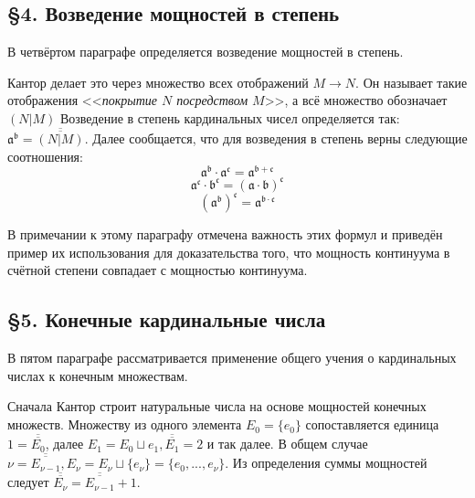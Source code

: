 \documentclass[a4paper,12pt]{extarticle}
\theoremstyle{definition}
\newcommand{\cit}[1]{<<\textit{#1}>>}
\newcommand{\car}[1]{\overline{\overline{#1}}}
\begin{document}
\subsection{\S 4. Возведение мощностей в степень}
В четвёртом параграфе определяется возведение мощностей в степень.

Кантор делает это через множество всех отображений $M \rightarrow N$.
Он называет такие отображения \cit{покрытие $N$ посредством $M$}, а всё множество обозначает $(N|M)$
Возведение в степень кардинальных чисел определяется так: $\mathfrak{a^b} = \car{(N|M)}$.
Далее сообщается, что для возведения в степень верны следующие соотношения:
$$\mathfrak{a^b \cdot a^c = a^{b+c}}$$
$$\mathfrak{a^c \cdot b^c = (a \cdot b)^c}$$
$$\mathfrak{(a^b)^c = a^{b \cdot c}}$$

В примечании к этому параграфу отмечена важность этих формул и приведён пример их использования для доказательства того,
что мощность континуума в счётной степени совпадает с мощностью континуума.

\subsection{\S 5. Конечные кардинальные числа}
В пятом параграфе рассматривается применение общего учения о кардинальных числах к конечным множествам.

Сначала Кантор строит натуральные числа на основе мощностей конечных множеств.
Множеству из одного элемента $E_0 = \{e_0\}$ сопоставляется единица $1 = \car{E_0}$, далее $E_1 = E_0 \sqcup {e_1}, \car{E_1} = 2$ и так далее.
В общем случае $\nu = \car{E_{\nu - 1}}, E_{\nu} = E_{\nu} \sqcup \{e_{\nu}\} = \{e_0, ..., e_{\nu}\}$.
Из определения суммы мощностей следует $\car{E_{\nu}} = \car{E_{\nu-1}} + 1$.
\end{document}
